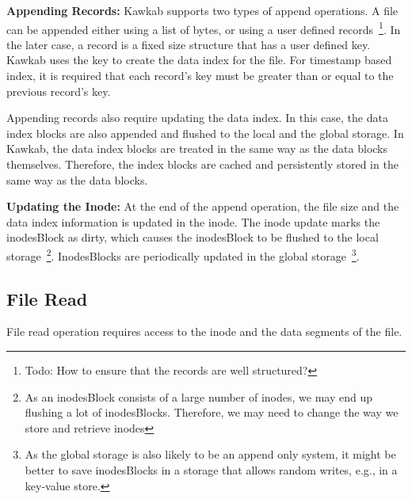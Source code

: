 \documentclass[]{article}
\newcommand{\subtopic}[1]{\vspace{1.5pt} \noindent \textbf{#1}}
\begin{document}
\subtopic{Appending Records:} Kawkab supports two types of append operations. A
file can be appended either using a list of bytes, or using a user defined
records~\footnote{Todo: How to ensure that the records are well structured?}.
In the later case, a record is a fixed size structure that has a user defined
key. Kawkab uses the key to create the data index for the file. For timestamp
based index, it is required that each record's key must be greater than or
equal to the previous record's key.

Appending records also require updating the data index. In this case, the
data index blocks are also appended and flushed to the local and the
global storage. In Kawkab, the data index blocks are treated in the
same way as the data blocks themselves. Therefore, the index blocks
are cached and persistently stored in the same way as the data blocks.


\subtopic{Updating the Inode:} At the end of the append operation, the file
size and the data index information is updated in the inode. The inode
update marks the inodesBlock as dirty, which causes the inodesBlock
to be flushed to the local storage~\footnote{As an inodesBlock consists of
a large number of inodes, we may end up flushing a lot of inodesBlocks. Therefore,
we may need to change the way we store and retrieve inodes}. InodesBlocks
are periodically updated in the global storage~\footnote{As the global storage
is also likely to be an append only system, it might be better to save inodesBlocks
in a storage that allows random writes, e.g., in a key-value store.}.




\subsection{File Read}

File read operation requires access to the inode and the data segments of the
file. 
\end{document}
